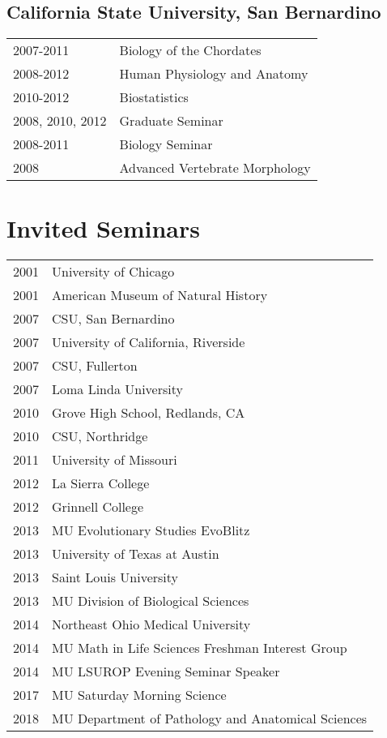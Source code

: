 \documentclass[11pt, a4paper]{awesome-cv}
\begin{document}

\hypertarget{california-state-university-san-bernardino}{%
\subsection{California State University, San
Bernardino}\label{california-state-university-san-bernardino}}

\begin{tabular}{ll}
  2007-2011 & Biology of the Chordates \\ 
  2008-2012 & Human Physiology and Anatomy \\ 
  2010-2012 & Biostatistics \\ 
  2008, 2010, 2012 & Graduate Seminar \\ 
  2008-2011 & Biology Seminar \\ 
  2008 & Advanced Vertebrate Morphology \\ 
  \end{tabular}

\hypertarget{invited-seminars}{%
\section{Invited Seminars}\label{invited-seminars}}

\begin{tabular}{ll}
  2001 & University of Chicago \\ 
  2001 & American Museum of Natural History \\ 
  2007 & CSU, San Bernardino \\ 
  2007 & University of California, Riverside \\ 
  2007 & CSU, Fullerton \\ 
  2007 & Loma Linda University \\ 
  2010 & Grove High School, Redlands, CA \\ 
  2010 & CSU, Northridge \\ 
  2011 & University of Missouri \\ 
  2012 & La Sierra College \\ 
  2012 & Grinnell College \\ 
  2013 & MU Evolutionary Studies EvoBlitz \\ 
  2013 & University of Texas at Austin \\ 
  2013 & Saint Louis University \\ 
  2013 & MU Division of Biological Sciences \\ 
  2014 & Northeast Ohio Medical University \\ 
  2014 & MU Math in Life Sciences Freshman Interest Group \\ 
  2014 & MU LSUROP Evening Seminar Speaker \\ 
  2017 & MU Saturday Morning Science \\ 
  2018 & MU Department of Pathology and Anatomical Sciences \\ 
  \end{tabular}
\end{document}

